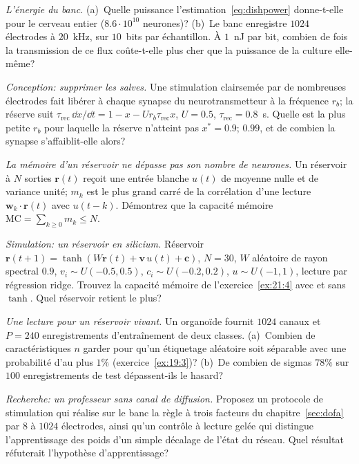 \begin{exercise}[\lvlA]
\label{ex:21:2}
\emph{L'énergie du banc.} (a)~Quelle puissance l'estimation~\eqref{eq:dishpower} donne-t-elle pour le cerveau entier ($8.6\cdot10^{10}$ neurones)? (b)~Le banc enregistre $1024$ électrodes à $20$~kHz, sur $10$~bits par échantillon. À $1$~nJ par bit, combien de fois la transmission de ce flux coûte-t-elle plus cher que la puissance de la culture elle-même?
\end{exercise}

\begin{exercise}[\lvlB]
\label{ex:21:3}
\emph{Conception: supprimer les salves.} Une stimulation clairsemée par de nombreuses électrodes fait libérer à chaque synapse du neurotransmetteur à la fréquence $r_b$; la réserve suit $\tau_{\text{rec}}\,\dd x/\dd t=1-x-Ur_b\tau_{\text{rec}}x$, $U=0.5$, $\tau_{\text{rec}}=0.8$~s. Quelle est la plus petite $r_b$ pour laquelle la réserve n'atteint pas $x^*=0.9$; $0.99$, et de combien la synapse s'affaiblit-elle alors?
\end{exercise}

\begin{exercise}[\lvlB]
\label{ex:21:4}
\emph{La mémoire d'un réservoir ne dépasse pas son nombre de neurones.} Un réservoir à $N$ sorties $\mathbf r(t)$ reçoit une entrée blanche $u(t)$ de moyenne nulle et de variance unité; $m_k$ est le plus grand carré de la corrélation d'une lecture $\mathbf w_k\cdot\mathbf r(t)$ avec $u(t-k)$. Démontrez que la capacité mémoire $\mathrm{MC}=\sum_{k\ge0}m_k\le N$.
\end{exercise}

\begin{exercise}[\lvlB]
\label{ex:21:5}
\emph{Simulation: un réservoir en silicium.} Réservoir $\mathbf r(t+1)=\tanh(W\mathbf r(t)+\mathbf v\,u(t)+\mathbf c)$, $N=30$, $W$ aléatoire de rayon spectral $0.9$, $v_i\sim U(-0.5,0.5)$, $c_i\sim U(-0.2,0.2)$, $u\sim U(-1,1)$, lecture par régression ridge. Trouvez la capacité mémoire de l'exercice~\ref{ex:21:4} avec et sans $\tanh$. Quel réservoir retient le plus?
\end{exercise}

\begin{exercise}[\lvlB]
\label{ex:21:6}
\emph{Une lecture pour un réservoir vivant.} Un organoïde fournit $1024$ canaux et $P=240$ enregistrements d'entraînement de deux classes. (a)~Combien de caractéristiques $n$ garder pour qu'un étiquetage aléatoire soit séparable avec une probabilité d'au plus $1\%$ (exercice~\ref{ex:19:3})? (b)~De combien de sigmas $78\%$ sur $100$ enregistrements de test dépassent-ils le hasard?
\end{exercise}

\begin{exercise}[\lvlC]
\label{ex:21:7}
\emph{Recherche: un professeur sans canal de diffusion.} Proposez un protocole de stimulation qui réalise sur le banc la règle à trois facteurs du chapitre~\ref{sec:dofa} par $8$ à $1024$ électrodes, ainsi qu'un contrôle à lecture gelée qui distingue l'apprentissage des poids d'un simple décalage de l'état du réseau. Quel résultat réfuterait l'hypothèse d'apprentissage?
\end{exercise}
